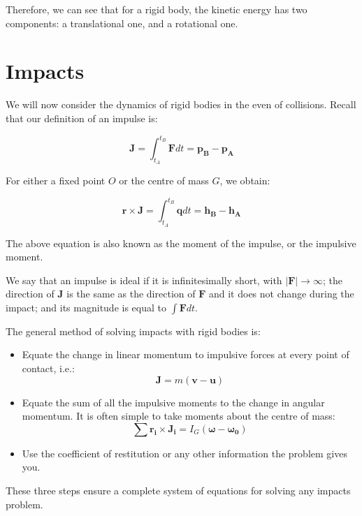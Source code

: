 \documentclass[12pt]{article}
\begin{document}
Therefore, we can see that for a rigid body, the kinetic energy has two components: a translational one, and a rotational one.

\newpage

\section{Impacts}

We will now consider the dynamics of rigid bodies in the even of collisions. Recall that our definition of an impulse is:

\[ \mathbf{J} = \int_{t_A}^{t_B} \mathbf{F}dt = \mathbf{p_B} - \mathbf{p_A} \]

For either a fixed point $O$ or the centre of mass $G$, we obtain:

\[ \mathbf{r} \times \mathbf{J} = \int_{t_A}^{t_B}\mathbf{q}dt = \mathbf{h_B} - \mathbf{h_A} \]

The above equation is also known as the moment of the impulse, or the impulsive moment.

\begin{definition}
    We say that an impulse is ideal if it is infinitesimally short, with $|\mathbf{F}| \to \infty$; the direction of $\mathbf{J}$ is the same as the direction of $\mathbf{F}$ and it does not change during the impact; and its magnitude is equal to $\int \mathbf{F}dt$.
\end{definition}

The general method of solving impacts with rigid bodies is:

\begin{itemize}
    \item Equate the change in linear momentum to impulsive forces at every point of contact, i.e.:
    \[ \mathbf{J} = m(\mathbf{v} - \mathbf{u}) \]
    \item Equate the sum of all the impulsive moments to the change in angular momentum. It is often simple to take moments about the centre of mass:
    \[ \sum \mathbf{r_i} \times \mathbf{J_i} = I_G(\mathbf{\omega} - \mathbf{\omega_0}) \]
    \item Use the coefficient of restitution or any other information the problem gives you.
\end{itemize}

These three steps ensure a complete system of equations for solving any impacts problem.
\end{document}
